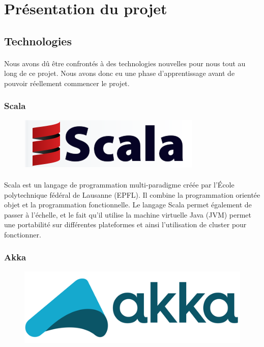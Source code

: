 \documentclass[a4paper,10pt]{article}
\begin{document}
\newpage

\section{Présentation du projet}

\subsection{Technologies}

\paragraph{}
Nous avons dû être confrontés à des technologies nouvelles pour nous tout au long de ce projet. Nous avons donc eu une phase d'apprentissage avant de pouvoir réellement commencer le projet.

\subsubsection{Scala} 
\begin{figure}[h!]
\includegraphics[scale=0.15,right]{image/scala.png}
\end{figure}
\paragraph{}
Scala est un langage de programmation multi-paradigme créée par l’École polytechnique fédéral de Lausanne (EPFL). Il combine la programmation orientée objet et la programmation fonctionnelle. Le langage Scala permet également de passer à l’échelle, et le fait qu’il utilise la machine virtuelle Java (JVM) permet une portabilité sur différentes plateformes et ainsi l’utilisation de cluster pour fonctionner.

\subsubsection{Akka} 
\begin{figure}[h!]
\includegraphics[scale=0.1,right]{image/akka.png}
\end{figure}
\end{document}

